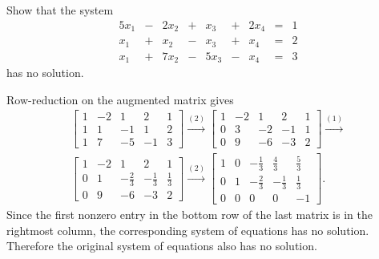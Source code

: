  Show that the system
\begin{alignat*}{5}
  x_1 &{}-{}& 2x_2 &{}+{}& x_3 &{}+{}& 2x_4 &{}={}& 1 \\
  x_1 &{}+{}& x_2 &{}-{}& x_3 &{}+{}& x_4 &{}={}& 2 \\
  x_1 &{}+{}& 7x_2 &{}-{}& 5x_3 &{}-{}& x_4 &{}={}& 3
\end{alignat*}
has no solution.
\begin{solution}
  Row-reduction on the augmented matrix gives
  \begin{gather*}
    \begin{bmatrix}
      1 & -2 & 1 & 2 & 1 \\
      1 & 1 & -1 & 1 & 2 \\
      1 & 7 & -5 & -1 & 3
    \end{bmatrix}
    \xrightarrow{(2)}
    \begin{bmatrix}
      1 & -2 & 1 & 2 & 1 \\
      0 & 3 & -2 & -1 & 1 \\
      0 & 9 & -6 & -3 & 2
    \end{bmatrix}
    \xrightarrow{(1)} \\
    \begin{bmatrix}
      1 & -2 & 1 & 2 & 1 \\[3pt]
      0 & 1 & -\frac23 & -\frac13 & \frac13 \\[3pt]
      0 & 9 & -6 & -3 & 2
    \end{bmatrix}
    \xrightarrow{(2)}
    \begin{bmatrix}
      1 & 0 & -\frac13 & \frac43 & \frac53 \\[3pt]
      0 & 1 & -\frac23 & -\frac13 & \frac13 \\[3pt]
      0 & 0 & 0 & 0 & -1
    \end{bmatrix}.
  \end{gather*}
  Since the first nonzero entry in the bottom row of the last matrix
  is in the rightmost column, the corresponding system of equations
  has no solution. Therefore the original system of equations also has
  no solution.
\end{solution}


